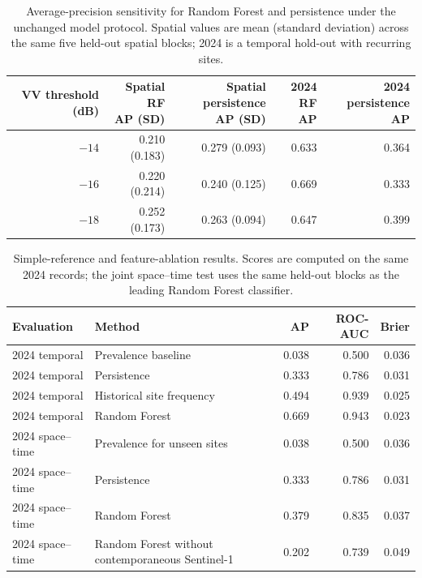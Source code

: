 \documentclass[pdflatex,sn-mathphys,Numbered]{sn-jnl}
\begin{document}
\begin{table}[t]
\centering
\caption{Average-precision sensitivity for Random Forest and persistence under the unchanged model protocol. Spatial values are mean (standard deviation) across the same five held-out spatial blocks; 2024 is a temporal hold-out with recurring sites.}
\label{tab:model-threshold-sensitivity}
\small
\setlength{\tabcolsep}{3pt}
\begin{tabularx}{\textwidth}{@{}r r r r r@{}}
\toprule
VV threshold (dB) & \makecell{Spatial RF\\AP (SD)} & \makecell{Spatial persistence\\AP (SD)} & \makecell{2024 RF\\AP} & \makecell{2024 persistence\\AP} \\
\midrule
$-14$ & 0.210 (0.183) & 0.279 (0.093) & 0.633 & 0.364 \\
$-16$ & 0.220 (0.214) & 0.240 (0.125) & 0.669 & 0.333 \\
$-18$ & 0.252 (0.173) & 0.263 (0.094) & 0.647 & 0.399 \\
\bottomrule
\end{tabularx}
\end{table}

\begin{table}[t]
\centering
\caption{Simple-reference and feature-ablation results. Scores are computed on the same 2024 records; the joint space--time test uses the same held-out blocks as the leading Random Forest classifier.}
\label{tab:baselines}
\small
\setlength{\tabcolsep}{3pt}
\begin{tabularx}{\textwidth}{@{}l X r r r@{}}
\toprule
Evaluation & Method & AP & ROC-AUC & Brier \\
\midrule
2024 temporal & Prevalence baseline & 0.038 & 0.500 & 0.036 \\
2024 temporal & Persistence & 0.333 & 0.786 & 0.031 \\
2024 temporal & Historical site frequency & 0.494 & 0.939 & 0.025 \\
2024 temporal & Random Forest & 0.669 & 0.943 & 0.023 \\
2024 space--time & Prevalence for unseen sites & 0.038 & 0.500 & 0.036 \\
2024 space--time & Persistence & 0.333 & 0.786 & 0.031 \\
2024 space--time & Random Forest & 0.379 & 0.835 & 0.037 \\
2024 space--time & Random Forest without contemporaneous Sentinel-1 & 0.202 & 0.739 & 0.049 \\
\bottomrule
\end{tabularx}
\end{table}
\end{document}
